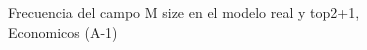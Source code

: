 \begin{figure}[H]
    \centering
    
    \caption{Frecuencia del campo M size en el modelo real y top2+1, Economicos (A-1)}
    \label{frecuency-M Size-top2+1}
\end{figure}